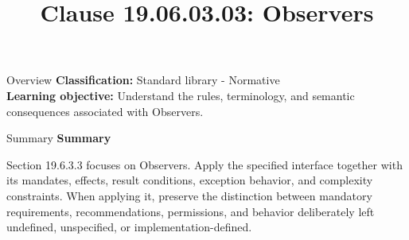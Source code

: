 \documentclass[10pt,letterpaper]{article}
\title{Clause 19.06.03.03: Observers}
\author{}
\date{}
\begin{document}
\maketitle
\begin{CornellOverviewBox}{Overview}
\textbf{Classification:} Standard library - Normative\\[2pt]
\textbf{Learning objective:} Understand the rules, terminology, and semantic consequences associated with Observers.
\end{CornellOverviewBox}\begin{CornellSummaryBox}{Summary}
{\sffamily\bfseries\color{Accent} Summary}\par\vspace{3pt}Section 19.6.3.3 focuses on Observers. Apply the specified interface together with its mandates, effects, result conditions, exception behavior, and complexity constraints. When applying it, preserve the distinction between mandatory requirements, recommendations, permissions, and behavior deliberately left undefined, unspecified, or implementation-defined.
\end{CornellSummaryBox}
\end{document}
